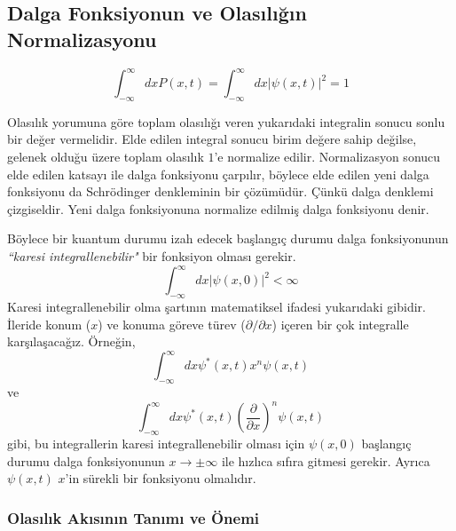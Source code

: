 \documentclass[00_kitap.tex]{subfiles}
\begin{document}
\subsection{Dalga Fonksiyonun ve Olasılığın Normalizasyonu}

\begin{equation}
\int ^{\infty }_{-\infty }dxP\left( x,t\right) =\int ^{\infty }_{-\infty }dx\left| \psi \left( x,t\right) \right| ^{2}=1
\label{eq:probability_norm}
\end{equation}

Olasılık yorumuna göre toplam olasılığı veren yukarıdaki integralin  sonucu sonlu bir değer vermelidir.  Elde edilen integral sonucu birim değere sahip değilse, gelenek olduğu üzere toplam olasılık $1$'e normalize edilir.  Normalizasyon sonucu  elde edilen katsayı ile dalga fonksiyonu çarpılır, böylece elde edilen yeni dalga fonksiyonu da Schrödinger denkleminin bir çözümüdür. Çünkü dalga denklemi çizgiseldir. Yeni dalga fonksiyonuna normalize edilmiş dalga fonksiyonu denir.

Böylece bir kuantum durumu izah edecek başlangıç durumu dalga fonksiyonunun \emph{``karesi integrallenebilir"} bir fonksiyon olması gerekir. 
\begin{equation}
\int ^{\infty }_{-\infty }dx\left| \psi \left( x,0\right) \right| ^{2} < \infty
\label{eq:square_integrable}
\end{equation}
Karesi integrallenebilir olma şartının matematiksel ifadesi yukarıdaki gibidir. İleride konum ($x$) ve konuma göreve türev ($\partial/\partial x$) içeren bir çok integralle karşılaşacağız. Örneğin,
\begin{equation*}
\int ^{\infty }_{-\infty }dx \psi^* \left( x,t\right) x^n \psi \left( x,t\right) 
\end{equation*}
ve
\begin{equation*}
\int ^{\infty }_{-\infty }dx \psi^* \left( x,t\right) \left(\frac{\partial}{\partial x}\right)^n \psi \left( x,t\right) 
\end{equation*}
gibi, bu integrallerin karesi integrallenebilir olması için $\psi(x,0)$ başlangıç durumu dalga fonksiyonunun $x\rightarrow\pm\infty$ ile hızlıca sıfıra gitmesi gerekir. Ayrıca $\psi(x,t)$ $x$'in sürekli bir fonksiyonu olmalıdır.

\subsubsection{Olasılık Akısının Tanımı ve Önemi}
\end{document}
